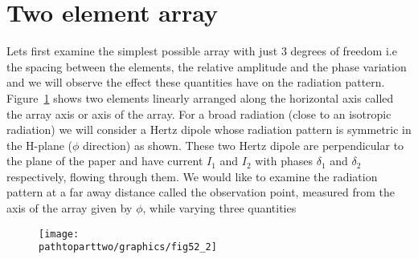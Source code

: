\section{Two element array}
Lets first examine the simplest possible array with just 3 degrees of freedom i.e the spacing between the elements, the relative amplitude and the phase variation and we will observe the effect these quantities have on the radiation pattern. Figure~\ref{52.2} shows two elements linearly arranged along the horizontal axis called the array axis or axis of the array. For a broad radiation (close to an isotropic radiation) we will consider a Hertz dipole whose radiation pattern is symmetric in the H-plane ($\phi$ direction) as shown. These two Hertz dipole are perpendicular to the plane of the paper and have current $I_1$ and $I_2$ with phases $\delta_1$ and $\delta_2$ respectively, flowing through them. We would like to examine the radiation pattern at a far away distance called the observation point, measured from the axis of the array given by $\phi$, while varying three quantities
\begin{figure}[h]
\centering
\texttt{[image: \\pathtoparttwo/graphics/fig52\_2]}
\caption{}
\label{52.2}
\end{figure}

